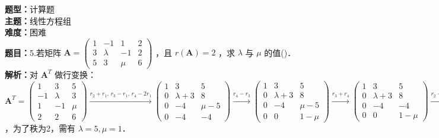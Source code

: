 \documentclass{ctexart}
\newenvironment{question}[5]{%
	\noindent\textbf{题型：}#1\\
	\textbf{主题：}#2\\
	\textbf{难度：}#3\\
	\textbf{题目：}#4\\
	\textbf{解析：}#5\\
	\vspace{1em}
}{}
\begin{document}
	\begin{question}
		{计算题}
		{线性方程组}
		{困难}
		{5.若矩阵 \(\mathbf{A}=\left(\begin{array}{cccc}1 & -1 & 1 & 2 \\ 3 & \lambda & -1 & 2 \\ 5 & 3 & \mu & 6\end{array}\right)\) ，且 \(r(\mathbf{A})=2\) ，求 \(\lambda\) 与 \(\mu\) 的值(\qquad)．}
		{对 \(\mathbf{A}^T\) 做行变换：\(\mathbf{A}^T=\left(\begin{array}{ccc}1 & 3 & 5 \\ -1 & \lambda & 3 \\ 1 & -1 & \mu \\ 2 & 2 & 6\end{array}\right) \xrightarrow{r_2 + r_1,\, r_3 - r_1,\, r_4 - 2r_1} \left(\begin{array}{ccc}1 & 3 & 5 \\ 0 & \lambda + 3 & 8 \\ 0 & -4 & \mu - 5 \\ 0 & -4 & -4\end{array}\right) \xrightarrow{r_4 - r_3} \left(\begin{array}{ccc}1 & 3 & 5 \\ 0 & \lambda + 3 & 8 \\ 0 & -4 & \mu - 5 \\ 0 & 0 & 1 - \mu\end{array}\right) \xrightarrow{r_3 + r_4} \left(\begin{array}{ccc}1 & 3 & 5 \\ 0 & \lambda + 3 & 8 \\ 0 & -4 & -4 \\ 0 & 0 & 1 - \mu\end{array}\right) \xrightarrow{r_2 + 2r_3} \left(\begin{array}{ccc}1 & 3 & 5 \\ 0 & \lambda - 5 & 0 \\ 0 & -4 & -4 \\ 0 & 0 & 1 - \mu\end{array}\right)\) ，为了秩为2，需有 \(\lambda = 5, \mu = 1\)．}
	\end{question}
	
\end{document}
